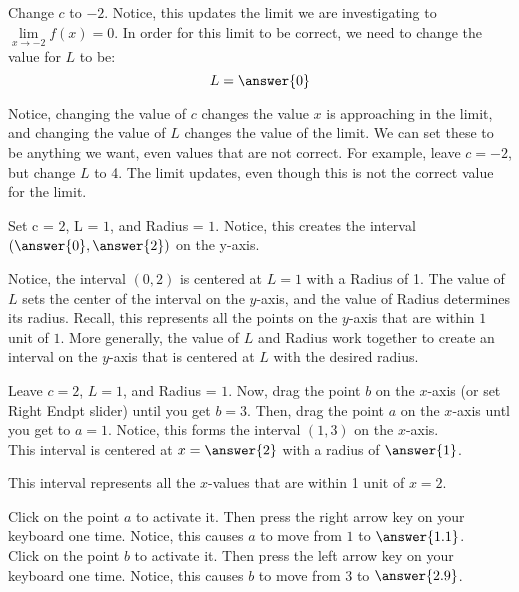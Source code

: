 \documentclass{ximera}
\begin{document}
\begin{exercise}
    \begin{question}
   	  Change $ c $ to $-2$.  Notice, this updates the limit we are investigating to $\lim\limits_{x \to -2}f(x)=0$.  In order for this limit to be correct, we need to change the value for $ L $ to be: 
   	  \[
   	      L=\answer{0}
   	  \]
   	  \begin{feedback}
   	  	Notice, changing the value of $ c $ changes the value $x$ is approaching in the limit, and changing the value of $L$ changes the value of the limit.  We can set these to be anything we want, even values that are not correct.  For example, leave $ c=-2 $, but change $ L $ to 4.  The limit updates, even though this is not the correct value for the limit.
   	  \end{feedback}
      \begin{question}
      	Set c = $2$, L = $1$, and Radius = $1$.  Notice, this creates the interval $\left(\answer{0}, \answer{2}\right)$ on the y-axis.
      	\begin{feedback}
      		Notice, the interval $(0,2)$ is centered at $L=1$ with a Radius of 1.  The value of $ L $ sets the center of the interval on the $y$-axis, and the value of Radius determines its radius.  Recall, this represents all the points on the $y$-axis that are within $1$ unit of $1$.  More generally, the value of $ L $ and Radius work together to create an interval on the $y$-axis that is centered at $ L $ with the desired radius.
      	\end{feedback}
        \begin{question}
        	Leave $c=2$, $L = 1$, and Radius = $1$.  Now, drag the point $b$ on the $x$-axis (or set Right Endpt slider) until you get $b=3$.  Then, drag the point $a$ on the $x$-axis untl you get to $a=1$.  Notice, this forms the interval $(1,3)$ on the $x$-axis. \\
        	This interval is centered at $x=\answer{2}$ with a radius of $\answer{1}$.
        	\begin{feedback}
        		This interval represents all the $x$-values that are within 1 unit of $x=2$.
        	\end{feedback}
        	\begin{question}
        		Click on the point $a$ to activate it.  Then press the right arrow key on your keyboard one time.  Notice, this causes $a$ to move from $1$ to $\answer{1.1}$.\\
        		Click on the point $b$ to activate it.  Then press the left arrow key on your keyboard one time.  Notice, this causes $b$ to move from $3$ to $\answer{2.9}$.\\

\end{question}
\end{question}
\end{question}
\end{question}
\end{exercise}
\end{document}
